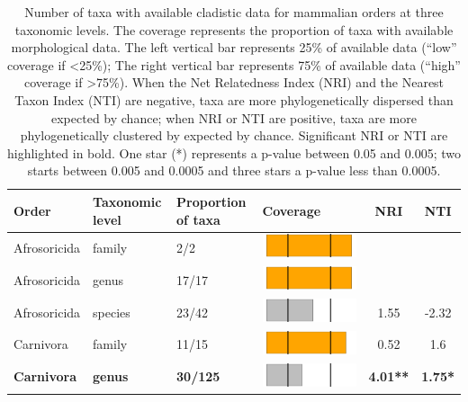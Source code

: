 \begin{longtable}{lL{1.8cm}C{2cm}lcc}
\caption{Number of taxa with available cladistic data for mammalian orders at three taxonomic levels. The coverage represents the proportion of taxa with available morphological data. The left vertical bar represents 25\% of available data (``low'' coverage if \textless 25\%); The right vertical bar represents 75\% of available data (``high'' coverage if \textgreater 75\%). When the Net Relatedness Index (NRI) and the Nearest Taxon Index (NTI) are negative, taxa are more phylogenetically dispersed than expected by chance; when NRI or NTI are positive, taxa are more phylogenetically clustered by expected by chance. Significant NRI or NTI are highlighted in bold. One star (*) represents a p-value between 0.05 and 0.005; two starts between 0.005 and 0.0005 and three stars a p-value less than 0.0005.} \\ 
  \hline
Order & Taxonomic level & Proportion of taxa & Coverage & NRI & NTI \\ 
  \hline
Afrosoricida & family & 2/2 & \includegraphics[width=0.20\linewidth, height=0.05\linewidth]{Table_figures/bar1.pdf} &   &   \\ 
  Afrosoricida & genus & 17/17 & \includegraphics[width=0.20\linewidth, height=0.05\linewidth]{Table_figures/bar2.pdf} &   &   \\ 
  Afrosoricida & species & 23/42 & \includegraphics[width=0.20\linewidth, height=0.05\linewidth]{Table_figures/bar3.pdf} & 1.55 & -2.32 \\ 
  Carnivora & family & 11/15 & \includegraphics[width=0.20\linewidth, height=0.05\linewidth]{Table_figures/bar4.pdf} & 0.52 & 1.6 \\ 
  \textbf{Carnivora} & \textbf{genus} & \textbf{30/125} & \includegraphics[width=0.20\linewidth, height=0.05\linewidth]{Table_figures/bar5.pdf} & \textbf{4.01**} & \textbf{1.75*} \\ 

\end{longtable}
